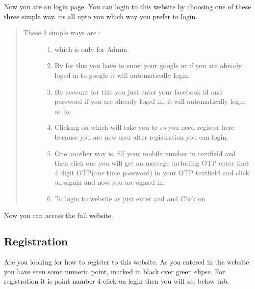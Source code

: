 \documentclass[a4paper,10pt,english]{report}
\begin{document}
Now you are on login page, You can login to this website by choosing one of these three simple way. its all upto you which way you prefer to login.
\begin{quote}
\begin{description}
\item[{These 3 simple ways are :}] \leavevmode\begin{enumerate}
\def\theenumi{\arabic{enumi}}
\def\labelenumi{\theenumi .}
\makeatletter\def\p@enumii{\p@enumi \theenumi .}\makeatother
\item {} 
 which is only for Admin.

\item {} 
By  for this you have to enter your google  or if you are already loged in to google it will automatically login.

\item {} 
By  account for this you just enter your facebook id and password if you are already loged in, it will automatically login or by.

\item {} 
Clicking on  which will take you to  so you need register here because you are new user after registration you can login.

\item {} 
One another way is, fill your mobile number in  textfield and then click one  you will get an message including OTP enter that 4 digit OTP(one time password)  in your OTP textfield and click on signin and now you are signed in.

\item {} 
To login to website as  just enter  and  and Click on 

\end{enumerate}

\end{description}
\end{quote}

Now you can access the full website.


\subsection{Registration}
\label{\detokenize{register:registration}}\label{\detokenize{register::doc}}
Are you looking for how to register to this website. As you entered in the website you have seen some numeric point, marked in black over green elipse. For registration it is point number 4 click on login then you will see below tab.
\end{document}
